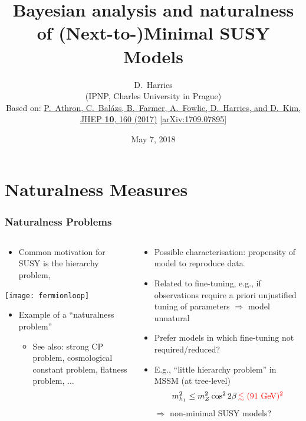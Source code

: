 \documentclass[10pt,aspectratio=169]{beamer}
\title{Bayesian analysis and naturalness of (Next-to-)Minimal SUSY Models}
\author{D.~Harries\\
  {\scriptsize
    (IPNP, Charles University in Prague)}\\
  \vspace{25pt}
  { \scriptsize
    Based on: \href{https://doi.org/10.1007/JHEP10(2017)160}{%
      P.~Athron, C.~Bal\'{a}zs, B.~Farmer, A.~Fowlie, D.~Harries,
      and D.~Kim, JHEP \textbf{10}, 160 (2017)}
    [\href{https://arxiv.org/abs/1709.07895}{arXiv:1709.07895}]
  }
}
\date[Phenomenology 2018, University of Pittsburgh]{May 7, 2018}
\begin{document}
\begin{frame}[plain]
  \titlepage
\end{frame}

\section{Naturalness Measures}

\begin{frame}
  \frametitle{Naturalness Problems}
  \begin{columns}[t]
    \begin{column}{0.5\textwidth}
      \begin{itemize} \itemsep1em
        \item Common motivation for SUSY is the hierarchy problem,
      \end{itemize}
      \begin{center}
        \texttt{[image: fermionloop]}
      \end{center}
      \begin{itemize} \itemsep1em
      \item Example of a \alert{``naturalness problem''}
        \begin{itemize}
        \item See also: strong CP problem, cosmological constant
          problem, flatness problem, $\ldots$
        \end{itemize}
      \end{itemize}
    \end{column}
    \begin{column}{0.5\textwidth}
      \begin{itemize} \itemsep1.5em
      \item Possible characterisation: {\color{blue} propensity of model to
        reproduce data}
      \item Related to \alert{fine-tuning}, e.g., if observations require
        a priori unjustified tuning of parameters $\Rightarrow$ model
        unnatural
      \item Prefer models in which fine-tuning not required/reduced?
      \item E.g., ``little hierarchy problem'' in MSSM
        (at tree-level)
        \begin{equation*}
          m_{h_1}^2 \leq m_Z^2 \cos^2 2\beta \, { \color{red} \lesssim
            (91 \text{ GeV})^2}
        \end{equation*}
        {\color{blue} $\Rightarrow$ non-minimal SUSY models?}
      \end{itemize}
    \end{column}
  \end{columns}
\end{frame}
\end{document}
